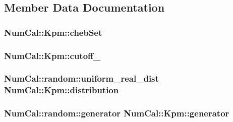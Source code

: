 \subsection{Member Data Documentation}
\hypertarget{classNumCal_1_1Kpm_af2c38bda650ee0c6127efc49f508e08b}{
\subsubsection[{cheb\+Set}]{ Num\+Cal\+::\+Kpm\+::cheb\+Set\hspace{0.3cm}{\ttfamily [private]}}}\label{classNumCal_1_1Kpm_af2c38bda650ee0c6127efc49f508e08b}
\hypertarget{classNumCal_1_1Kpm_a642a669599d105532db6f7381ae03a7f}{
\subsubsection[{cutoff\+\_\+}]{ Num\+Cal\+::\+Kpm\+::cutoff\+\_\+\hspace{0.3cm}{\ttfamily [private]}}}\label{classNumCal_1_1Kpm_a642a669599d105532db6f7381ae03a7f}
\hypertarget{classNumCal_1_1Kpm_acee26c7b6af3442b38556d761c172038}{
\subsubsection[{distribution}]{\setlength{\rightskip}{0pt plus 5cm}Num\+Cal\+::random\+::uniform\+\_\+real\+\_\+dist Num\+Cal\+::\+Kpm\+::distribution\hspace{0.3cm}{\ttfamily [private]}}}\label{classNumCal_1_1Kpm_acee26c7b6af3442b38556d761c172038}
\hypertarget{classNumCal_1_1Kpm_a9b09edf906b41f5c4109e7df953e8000}{
\subsubsection[{generator}]{\setlength{\rightskip}{0pt plus 5cm}Num\+Cal\+::random\+::generator Num\+Cal\+::\+Kpm\+::generator\hspace{0.3cm}{\ttfamily [private]}}}\label{classNumCal_1_1Kpm_a9b09edf906b41f5c4109e7df953e8000}
